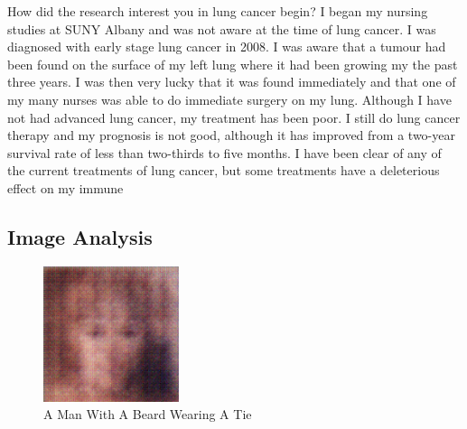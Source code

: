 \documentclass{article}%
\begin{document}
How did the research interest you in lung cancer begin?\newline%
I began my nursing studies at SUNY Albany and was not aware at the time of lung cancer. I was diagnosed with early stage lung cancer in 2008. I was aware that a tumour had been found on the surface of my left lung where it had been growing my the past three years. I was then very lucky that it was found immediately and that one of my many nurses was able to do immediate surgery on my lung. Although I have not had advanced lung cancer, my treatment has been poor. I still do lung cancer therapy and my prognosis is not good, although it has improved from a two{-}year survival rate of less than two{-}thirds to five months. I have been clear of any of the current treatments of lung cancer, but some treatments have a deleterious effect on my immune

%
\subsection{Image Analysis}%
\label{subsec:ImageAnalysis}%


\begin{figure}[h!]%
\centering%
\includegraphics[width=150px]{500_fake_images/samples_5_418.png}%
\caption{A Man With A Beard Wearing A Tie}%
\end{figure}

%
\end{document}
